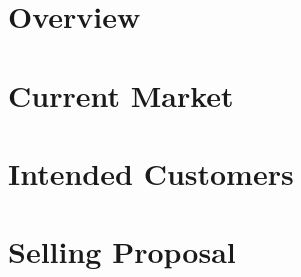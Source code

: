 
\newcommand*{\market}{chapters/market/}

\section{Overview}
	
\section{Current Market}
	
\section{Intended Customers}
	
\section{Selling Proposal}
	